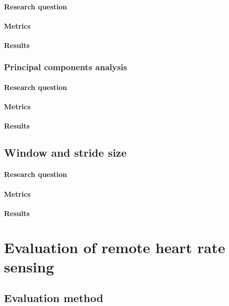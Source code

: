 \paragraph{Research question}
\paragraph{Metrics}
\paragraph{Results}

\subsubsection{Principal components analysis}
\paragraph{Research question}
\paragraph{Metrics}
\paragraph{Results}
%

\subsection{Window and stride size}
\paragraph{Research question}
\paragraph{Metrics}
\paragraph{Results}


\section{Evaluation of remote heart rate sensing}
\subsection{Evaluation method}
